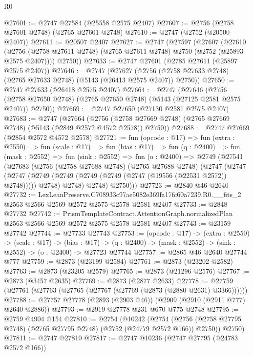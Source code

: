 \begin{lexlean}{R0}
\begin{coremodule}
@27601 := @2747 @27584 (@25558 @2575 @2407)
@27607 := @2756 (@2758 @27601 @2748) (@2765 @27601 @2748)
@27610 := @2747 (@2752 (@20500 @2407))
@27611 := @20507 @2407
@27627 := @2747
    (@27597
      (@27607
        (@27610
          (@2756 (@2758 @27611 @2748) (@2765 @27611 @2748) @2750 (@2752 (@25893 @2575 @2407))))
        @2750))
@27633 := @2747 @27601 (@2785 @27611 (@25897 @2575 @2407))
@27646 := @2747
    (@27627 (@2756 (@2758 @27633 @2748) (@2765 @27633 @2748) (@5143 (@26413 @2575 @2407)) @2750))
@27650 := @2747 @27633 (@26418 @2575 @2407)
@27664 := @2747
    (@27646
      (@2756 (@2758 @27650 @2748) (@2765 @27650 @2748) (@5143 (@27125 @2581 @2575 @2407)) @2750))
@27669 := @2747 @27650 (@27130 @2581 @2575 @2407)
@27683 := @2747
    (@27664
      (@2756 (@2758 @27669 @2748) (@2765 @27669 @2748) (@5143 (@2849 @2572 @4572 @2578)) @2750))
@27688 := @2747 @27669 (@2854 @2572 @4572 @2578)
@27721 := fun (opcode : @17) =>
  fun (extra : @2550) =>
  fun (scale : @17) =>
  fun (bias : @17) =>
  fun (q : @2400) =>
  fun (mask : @2552) =>
  fun (sink : @2552) =>
  fun (o : @2400) =>
  @2749
    (@27541
      (@27683
        (@2756
          (@2758 @27688 @2748)
          (@2765 @27688 @2748)
          (@2747
            (@2747
              (@2747 (@2749 (@2749 (@2749 (@2749 (@2747 (@19556 (@22531 @2572)) @2748))))) @2748)
              @2748)
            @2748)
          @2750)))
@27723 := @2840 @46 @2640
@27732 := LexLeanPreserve.C708933c97ae5082e369fa17fc60a7239.R0.__fits_2
    @2563
    @2566
    @2569
    @2572
    @2575
    @2578
    @2581
    @2407
@27733 := @2848 @27732
@27742 := PrismTemplateContract.AttentionGraph.normalizedPlan
    @2563
    @2566
    @2569
    @2572
    @2575
    @2578
    @2581
    @2407
@27743 := @23159 @27742
@27744 := @27733 @27743
@27753 := (opcode : @17) ->
  (extra : @2550) ->
  (scale : @17) ->
  (bias : @17) -> (q : @2400) -> (mask : @2552) -> (sink : @2552) -> (o : @2400) -> @27723 @27744
@27757 := @2865 @46 @2640 @27744 @777
@27759 := @2873 (@23199 @2584)
@27761 := @2873 (@23202 @2582)
@27763 := @2873 (@23205 @2579)
@27765 := @2873 (@21296 @2576)
@27767 := @2873 (@3457 @2635)
@27769 := @2873 (@2877 @2633)
@27778 := @27759 (@27761 (@27763 (@27765 (@27767 (@27769 (@2873 (@2880 @2631) @3366))))))
@27788 := @27757 @27778 (@2893 (@2903 @46)) (@2909 (@2910 (@2911 @777) @2640 @2886))
@27793 := @2919 @27778 @231 @670 @775 @2748
@27795 := @2759 @4904 @154
@27810 := @2754
    (@10242
      (@2754 (@2756 (@2758 @27795 @2748) (@2765 @27795 @2748) (@2752 (@24779 @2572 @166)) @2750))
      @2750)
@27811 := @2747 @27810
@27817 := @2747 @10236 (@2747 @27795 (@24783 @2572 @166))

\end{coremodule}
\end{lexlean}
